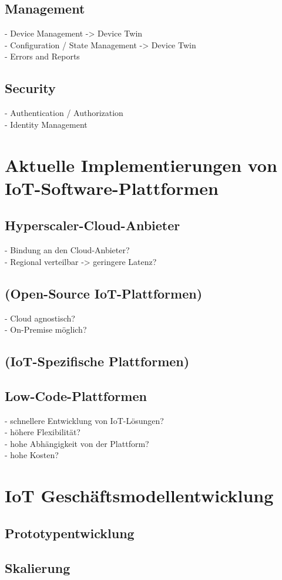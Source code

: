 \subsection{Management}\label{subsec:Management}
- Device Management -> Device Twin\\
- Configuration / State Management -> Device Twin\\
- Errors and Reports\\
\subsection{Security}\label{subsec:Security}
- Authentication / Authorization\\
- Identity Management\\
\section{Aktuelle Implementierungen von IoT-Software-Plattformen}\label{sec:Aktuelle Implementierungen von IoT-Software-Plattformen}
\subsection{Hyperscaler-Cloud-Anbieter}\label{subsec:Hyperscaler-Cloud-Anbieter}
- Bindung an den Cloud-Anbieter?\\
- Regional verteilbar -> geringere Latenz?\\
\subsection{(Open-Source IoT-Plattformen)}\label{subsec:(Open-Source IoT-Plattformen)}
- Cloud agnostisch?\\
- On-Premise möglich?\\
\subsection{(IoT-Spezifische Plattformen)}\label{subsec:(IoT-Spezifische Plattformen)}
\subsection{Low-Code-Plattformen}\label{subsec:Low-Code-Plattformen}
- schnellere Entwicklung von IoT-Lösungen?\\
- höhere Flexibilität?\\
- hohe Abhängigkeit von der Plattform?\\
- hohe Kosten?\\
\section{IoT Geschäftsmodellentwicklung}\label{sec:IoT Geschäftsmodellentwicklung}
\subsection{Prototypentwicklung}\label{subsec:Prototypentwicklung}
\subsection{Skalierung}\label{subsec:Skalierung}
